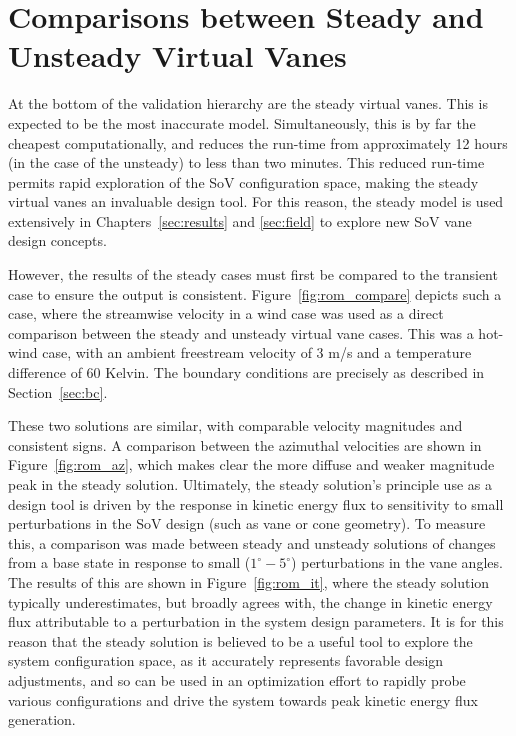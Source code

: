 \section{Comparisons between Steady and Unsteady Virtual Vanes}
\label{sec:steady_val}

At the bottom of the validation hierarchy are the steady virtual
vanes. This is expected to be the most inaccurate model. 
Simultaneously, this is by far the cheapest computationally, and 
reduces the run-time from approximately 12 hours (in the case of the
unsteady) to less than two minutes. This reduced run-time permits
rapid exploration of the SoV configuration space, making the steady
virtual vanes an invaluable design tool. For this reason, the steady
model is used extensively in Chapters~\ref{sec:results} and
\ref{sec:field} to explore new SoV vane design concepts. 

However, the results of the steady cases must first be
compared to the transient case to ensure the output is consistent. 
Figure~\ref{fig:rom_compare} depicts such a case, where the streamwise
velocity in a wind case was used as a direct comparison between the
steady and unsteady virtual vane cases. This was a hot-wind case, with
an ambient freestream velocity of 3 m/s and a temperature difference of 60
Kelvin. The boundary conditions are precisely as described in
Section~\ref{sec:bc}. 

These two solutions are similar, with comparable velocity magnitudes and 
consistent signs. A comparison between the azimuthal velocities are
shown in Figure~\ref{fig:rom_az}, which makes clear the more diffuse and
weaker magnitude peak in the steady solution. Ultimately, the steady
solution's principle use as a design tool is driven by the response in
kinetic energy flux to sensitivity to small perturbations in the SoV
design (such as vane or cone geometry). To measure this, a comparison
was made between steady and unsteady solutions of changes from a base state 
in response to small ($1^{\circ}-5^{\circ}$) perturbations in the vane
angles. The results of this are shown in Figure~\ref{fig:rom_it}, where
the steady solution typically underestimates, but broadly agrees with,
the change in kinetic energy flux attributable to a perturbation in the
system design parameters.  It is for this reason that the steady
solution is believed to be a useful tool to explore the system
configuration space, as it accurately represents favorable design
adjustments, and so can be used in an optimization effort to rapidly
probe various configurations and drive the system towards peak kinetic
energy flux generation.  

